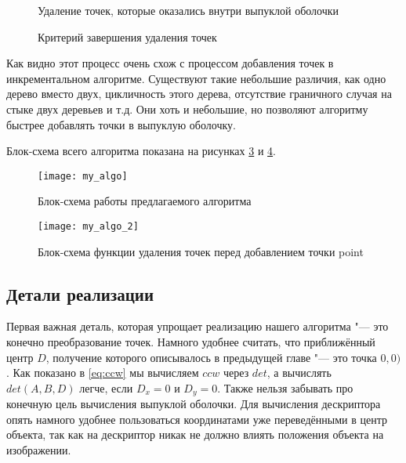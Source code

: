 \begin{figure}[hbt]
	{\centering
		\hfill
		\subbottom[\label{img:my_points_deletion_1_1}]{%
			}
		\hfill
		\subbottom[\label{img:my_points_deletion_1_2}]{%
			}
		\hfill
	}
	\caption{Удаление точек, которые оказались внутри выпуклой оболочки}
	\label{img:my_points_deletion_1}
\end{figure}

\begin{figure}[hbt]
	{\centering
		\hfill
		\subbottom[\label{img:my_points_deletion_2_1}]{%
			}
		\hfill
		\subbottom[\label{img:my_points_deletion_2_2}]{%
			}
		\hfill
	}
	\caption{Критерий завершения удаления точек}
	\label{img:my_points_deletion_2}
\end{figure}

Как видно этот процесс очень схож с процессом добавления точек в инкрементальном алгоритме. Существуют такие небольшие различия, как одно дерево вместо двух, цикличность этого дерева, отсутствие граничного случая на стыке двух деревьев и т.д. Они хоть и небольшие, но позволяют алгоритму быстрее добавлять точки в выпуклую оболочку.

Блок-схема всего алгоритма показана на рисунках \ref{img:my_algo} и \ref{img:my_algo_deletion}.

\begin{figure}
	\centering
	\texttt{[image: my\_algo]}
	\caption{Блок-схема работы предлагаемого алгоритма}
	\label{img:my_algo}
\end{figure}

\begin{figure}
	\centering
	\texttt{[image: my\_algo\_2]}
	\caption{Блок-схема функции удаления точек перед добавлением точки point}
	\label{img:my_algo_deletion}
\end{figure}

\subsection{Детали реализации} \label{subsect2_2_2}

Первая важная деталь, которая упрощает реализацию нашего алгоритма "--- это конечно преобразование точек. Намного удобнее считать, что приближённый центр $D$, получение которого описывалось в предыдущей главе "--- это точка $0, 0)$. Как показано в \eqref{eq:ccw} мы вычисляем $ccw$ через $det$, а вычислять $det(A, B, D)$ легче, если $D_x = 0$ и $D_y = 0$. Также нельзя забывать про конечную цель вычисления выпуклой оболочки. Для вычисления дескриптора опять намного удобнее пользоваться координатами уже переведёнными в центр объекта, так как на дескриптор никак не должно влиять положения объекта на изображении.

